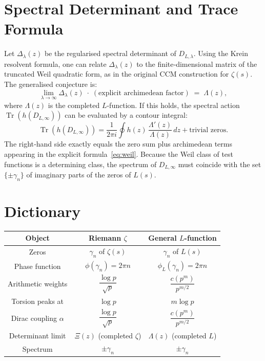 \documentclass[12pt,a4paper]{article}
\begin{document}
\section{Spectral Determinant and Trace Formula}

Let \(\Delta_\lambda(z)\) be the regularised spectral determinant of \(D_{L,\lambda}\). Using the Krein resolvent formula, one can relate \(\Delta_\lambda(z)\) to the finite‑dimensional matrix of the truncated Weil quadratic form, as in the original CCM construction for \(\zeta(s)\). The generalised conjecture is:
\[
\lim_{\lambda\to\infty} \Delta_\lambda(z)\;\cdot\;(\text{explicit archimedean factor}) \;=\; \Lambda(z),
\tag{6}
\]
where \(\Lambda(z)\) is the completed \(L\)-function. If this holds, the spectral action \(\operatorname{Tr}(h(D_{L,\infty}))\) can be evaluated by a contour integral:
\[
\operatorname{Tr}(h(D_{L,\infty})) = \frac{1}{2\pi i} \oint h(z)\,\frac{\Lambda'(z)}{\Lambda(z)}\,dz + \text{trivial zeros}.
\]
The right‑hand side exactly equals the zero sum plus archimedean terms appearing in the explicit formula~\eqref{eq:weil}. Because the Weil class of test functions is a determining class, the spectrum of \(D_{L,\infty}\) must coincide with the set \(\{\pm\gamma_n\}\) of imaginary parts of the zeros of \(L(s)\).

\section{Dictionary}

\begin{center}
\begin{tabular}{c|c|c}
\textbf{Object} & \textbf{Riemann \(\zeta\)} & \textbf{General \(L\)-function} \\
\hline
Zeros & \(\gamma_n\) of \(\zeta(s)\) & \(\gamma_n\) of \(L(s)\) \\
Phase function & \(\phi(\gamma_n)=2\pi n\) & \(\phi_L(\gamma_n)=2\pi n\) \\
Arithmetic weights & \(\dfrac{\log p}{\sqrt{p}}\) & \(\dfrac{c(p^m)}{p^{m/2}}\) \\
Torsion peaks at & \(\log p\) & \(m\log p\) \\
Dirac coupling \(\alpha\) & \(\dfrac{\log p}{\sqrt{p}}\) & \(\dfrac{c(p^m)}{p^{m/2}}\) \\
Determinant limit & \(\Xi(z)\) (completed \(\zeta\)) & \(\Lambda(z)\) (completed \(L\)) \\
Spectrum & \(\pm\gamma_n\) & \(\pm\gamma_n\) \\
\end{tabular}
\end{center}
\end{document}

